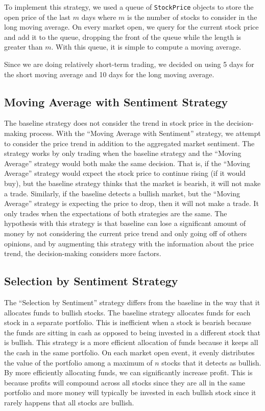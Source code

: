 To implement this strategy, we used a queue of \texttt{StockPrice} objects to store the open price of the last $m$ days where $m$ is the number of stocks to consider in the long moving average.
On every market open, we query for the current stock price and add it to the queue, dropping the front of the queue while the length is greater than $m$.
With this queue, it is simple to compute a moving average.

Since we are doing relatively short-term trading, we decided on using 5 days for the short moving average and 10 days for the long moving average.

\subsection{Moving Average with Sentiment Strategy}

The baseline strategy does not consider the trend in stock price in the decision-making process.
With the ``Moving Average with Sentiment'' strategy, we attempt to consider the price trend in addition to the aggregated market sentiment.
The strategy works by only trading when the baseline strategy and the ``Moving Average'' strategy would both make the same decision.
That is, if the ``Moving Average'' strategy would expect the stock price to continue rising (if it would buy), but the baseline strategy thinks that the market is bearish, it will not make a trade.
Similarly, if the baseline detects a bullish market, but the ``Moving Average'' strategy is expecting the price to drop, then it will not make a trade.
It only trades when the expectations of both strategies are the same.
The hypothesis with this strategy is that baseline can lose a significant amount of money by not considering the current price trend and only going off of others opinions, and by augmenting this strategy with the information about the price trend, the decision-making considers more factors. 

\subsection{Selection by Sentiment Strategy}

The ``Selection by Sentiment'' strategy differs from the baseline in the way that it allocates funds to bullish stocks.
The baseline strategy allocates funds for each stock in a separate portfolio.
This is inefficient when a stock is bearish because the funds are sitting in cash as opposed to being invested in a different stock that is bullish.
This strategy is a more efficient allocation of funds because it keeps all the cash in the same portfolio.
On each market open event, it evenly distributes the value of the portfolio among a maximum of $n$ stocks that it detects as bullish.
By more efficiently allocating funds, we can significantly increase profit.
This is because profits will compound across all stocks since they are all in the same portfolio and more money will typically be invested in each bullish stock since it rarely happens that all stocks are bullish.

